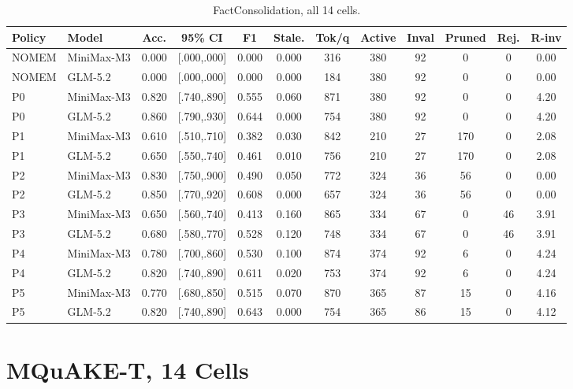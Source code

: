 \begin{table}[H]
\centering
\caption{FactConsolidation, all 14 cells.}
\label{tab:appendix-fc}
\tiny
\setlength{\tabcolsep}{2.6pt}
\begin{tabular}{llcccccccccc}
\toprule
Policy & Model & Acc. & 95\% CI & F1 & Stale. & Tok/q & Active & Inval & Pruned & Rej. & R-inv \\
\midrule
NOMEM & MiniMax-M3 & 0.000 & [.000,.000] & 0.000 & 0.000 & 316 & 380 & 92 & 0 & 0 & 0.00 \\
NOMEM & GLM-5.2 & 0.000 & [.000,.000] & 0.000 & 0.000 & 184 & 380 & 92 & 0 & 0 & 0.00 \\
P0 & MiniMax-M3 & 0.820 & [.740,.890] & 0.555 & 0.060 & 871 & 380 & 92 & 0 & 0 & 4.20 \\
P0 & GLM-5.2 & 0.860 & [.790,.930] & 0.644 & 0.000 & 754 & 380 & 92 & 0 & 0 & 4.20 \\
P1 & MiniMax-M3 & 0.610 & [.510,.710] & 0.382 & 0.030 & 842 & 210 & 27 & 170 & 0 & 2.08 \\
P1 & GLM-5.2 & 0.650 & [.550,.740] & 0.461 & 0.010 & 756 & 210 & 27 & 170 & 0 & 2.08 \\
P2 & MiniMax-M3 & 0.830 & [.750,.900] & 0.490 & 0.050 & 772 & 324 & 36 & 56 & 0 & 0.00 \\
P2 & GLM-5.2 & 0.850 & [.770,.920] & 0.608 & 0.000 & 657 & 324 & 36 & 56 & 0 & 0.00 \\
P3 & MiniMax-M3 & 0.650 & [.560,.740] & 0.413 & 0.160 & 865 & 334 & 67 & 0 & 46 & 3.91 \\
P3 & GLM-5.2 & 0.680 & [.580,.770] & 0.528 & 0.120 & 748 & 334 & 67 & 0 & 46 & 3.91 \\
P4 & MiniMax-M3 & 0.780 & [.700,.860] & 0.530 & 0.100 & 874 & 374 & 92 & 6 & 0 & 4.24 \\
P4 & GLM-5.2 & 0.820 & [.740,.890] & 0.611 & 0.020 & 753 & 374 & 92 & 6 & 0 & 4.24 \\
P5 & MiniMax-M3 & 0.770 & [.680,.850] & 0.515 & 0.070 & 870 & 365 & 87 & 15 & 0 & 4.16 \\
P5 & GLM-5.2 & 0.820 & [.740,.890] & 0.643 & 0.000 & 754 & 365 & 86 & 15 & 0 & 4.12 \\
\bottomrule
\end{tabular}
\end{table}

\section{MQuAKE-T, 14 Cells}
\label{sec:appendix-mq}

